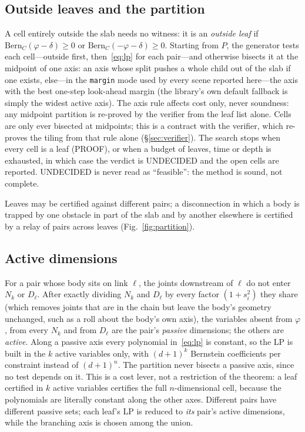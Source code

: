 \documentclass[10pt,twocolumn,letterpaper]{article}
\newcommand{\Bern}{\mathrm{Bern}}
\newcommand{\vphi}{\varphi}
\begin{document}
\subsection{Outside leaves and the partition}\label{sec:partition}
A cell entirely outside the slab needs no witness: it is an \emph{outside leaf} if $\Bern_C(\vphi-\delta)\ge0$ or $\Bern_C(-\vphi-\delta)\ge0$. Starting from $P$, the generator tests each cell---outside first, then~\eqref{eq:lp} for each pair---and otherwise bisects it at the midpoint of one axis: an axis whose split pushes a whole child out of the slab if one exists, else---in the \texttt{margin} mode used by every scene reported here---the axis with the best one-step look-ahead margin (the library's own default fallback is simply the widest active axis). The axis rule affects cost only, never soundness: any midpoint partition is re-proved by the verifier from the leaf list alone. Cells are only ever bisected at midpoints; this is a contract with the verifier, which re-proves the tiling from that rule alone (\S\ref{sec:verifier}). The search stops when every cell is a leaf (PROOF), or when a budget of leaves, time or depth is exhausted, in which case the verdict is UNDECIDED and the open cells are reported. UNDECIDED is never read as ``feasible'': the method is sound, not complete.

Leaves may be certified against different pairs; a disconnection in which a body is trapped by one obstacle in part of the slab and by another elsewhere is certified by a relay of pairs across leaves (Fig.~\ref{fig:partition}).

\subsection{Active dimensions}\label{sec:active}
For a pair whose body sits on link $\ell$, the joints downstream of $\ell$ do not enter $N_k$ or $D_\ell$. After exactly dividing $N_k$ and $D_\ell$ by every factor $(1+s_i^2)$ they share (which removes joints that are in the chain but leave the body's geometry unchanged, such as a roll about the body's own axis), the variables absent from $\vphi$, from every $N_k$ and from $D_\ell$ are the pair's \emph{passive} dimensions; the others are \emph{active}. Along a passive axis every polynomial in~\eqref{eq:lp} is constant, so the LP is built in the $k$ active variables only, with $(d+1)^k$ Bernstein coefficients per constraint instead of $(d+1)^n$. The partition never bisects a passive axis, since no test depends on it. This is a cost lever, not a restriction of the theorem: a leaf certified in $k$ active variables certifies the full $n$-dimensional cell, because the polynomials are literally constant along the other axes. Different pairs have different passive sets; each leaf's LP is reduced to \emph{its} pair's active dimensions, while the branching axis is chosen among the union.
\end{document}
